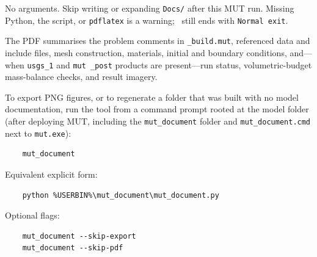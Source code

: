             {No arguments. Skip writing or expanding \texttt{Docs/} after this MUT run. Missing Python, the script, or \texttt{pdflatex} is a warning; \mut\ still ends with \texttt{Normal exit}.}

The PDF summarises the problem comments in \texttt{\_build.mut}, referenced data and include files, mesh construction, materials, initial and boundary conditions, and---when \texttt{usgs\_1} and \texttt{mut \_post} products are present---run status, volumetric-budget mass-balance checks, and result imagery.

To export PNG figures, or to regenerate a folder that was built with {\sf no model documentation}, run the tool from a command prompt rooted at the model folder (after deploying MUT, including the \texttt{mut\_document} folder and \texttt{mut\_document.cmd} next to \texttt{mut.exe}):
\begin{verbatim}
    mut_document
\end{verbatim}
Equivalent explicit form:
\begin{verbatim}
    python %USERBIN%\mut_document\mut_document.py
\end{verbatim}
Optional flags:
\begin{verbatim}
    mut_document --skip-export
    mut_document --skip-pdf
\end{verbatim}

